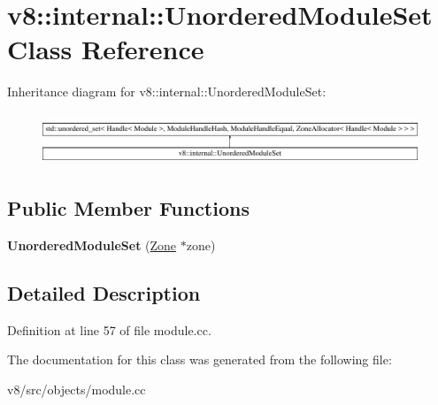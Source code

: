 \hypertarget{classv8_1_1internal_1_1UnorderedModuleSet}{}\section{v8\+:\+:internal\+:\+:Unordered\+Module\+Set Class Reference}
\label{classv8_1_1internal_1_1UnorderedModuleSet}
Inheritance diagram for v8\+:\+:internal\+:\+:Unordered\+Module\+Set\+:\begin{figure}[H]
\begin{center}
\leavevmode
\includegraphics[height=1.564246cm]{classv8_1_1internal_1_1UnorderedModuleSet}
\end{center}
\end{figure}
\subsection*{Public Member Functions}
\begin{DoxyCompactItemize}
\item 
\mbox{\label{classv8_1_1internal_1_1UnorderedModuleSet_a13e11e8c4e64158e727062bd7b67b89b}} 
{\bfseries Unordered\+Module\+Set} (\mbox{\hyperlink{classv8_1_1internal_1_1Zone}{Zone}} $\ast$zone)
\end{DoxyCompactItemize}


\subsection{Detailed Description}


Definition at line 57 of file module.\+cc.



The documentation for this class was generated from the following file\+:\begin{DoxyCompactItemize}
\item 
v8/src/objects/module.\+cc\end{DoxyCompactItemize}
